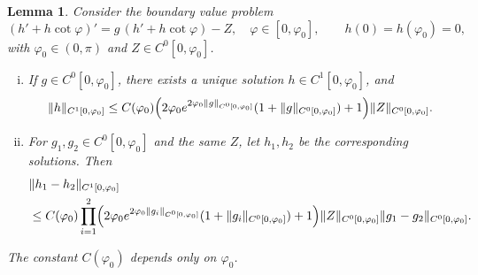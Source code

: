 \documentclass{amsart}
\newtheorem{lemma}[theorem]{Lemma}
\newcommand{\vp}{\varphi}
\begin{document}
\begin{lemma}\label{lm:ODEEst}
Consider the boundary value problem
\[
(h' + h\cot \varphi)' = g\,(h' + h\cot \varphi) - Z, \quad \vp \in [0,\varphi_0],\qquad h(0)=h(\varphi_0)=0,
\]
with $\varphi_0\in(0,\pi)$ and $Z\in C^0[0,\varphi_0]$.
\begin{enumerate}[(i)]
\item If $g\in C^0[0,\varphi_0]$, there exists a unique solution $h\in C^1[0,\varphi_0]$, and
\[
\|h\|_{C^1[0,\varphi_0]} \le C(\varphi_0)\Bigl(2\varphi_0 e^{2\varphi_0\|g\|_{C^0[0,\varphi_0]}}(1+\|g\|_{C^0[0,\varphi_0]}) + 1\Bigr)\|Z\|_{C^0[0,\varphi_0]}.
\]
\item For $g_1,g_2\in C^0[0,\varphi_0]$ and the same $Z$, let $h_1,h_2$ be the corresponding solutions.
Then
\begin{align*}
&\|h_1-h_2\|_{C^1[0,\varphi_0]} \\
&\le C(\varphi_0)\prod_{i=1}^2
\Bigl(2\varphi_0 e^{2\varphi_0\|g_i\|_{C^0[0,\varphi_0]}}(1+\|g_i\|_{C^0[0,\varphi_0]}) + 1\Bigr)
\|Z\|_{C^0[0,\varphi_0]}\|g_1-g_2\|_{C^0[0,\varphi_0]}.    
\end{align*}
\end{enumerate}
The constant $C(\varphi_0)$ depends only on $\varphi_0$.
\end{lemma}
\end{document}
